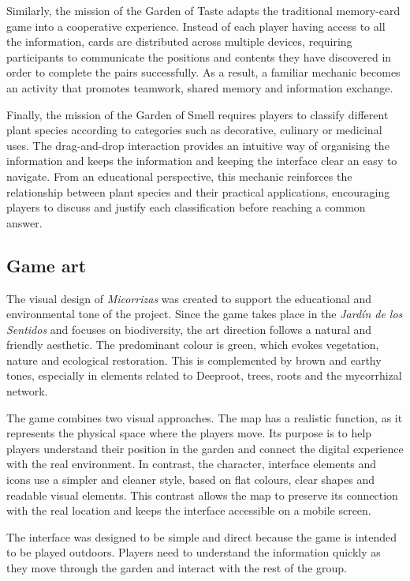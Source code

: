Similarly, the mission of the Garden of Taste adapts the traditional memory-card game into a cooperative experience. Instead of each player having access to all the information, cards are distributed across multiple devices, requiring participants to communicate the positions and contents they have discovered in order to complete the pairs successfully. As a result, a familiar mechanic becomes an activity that promotes teamwork, shared memory and information exchange.

Finally, the mission of the Garden of Smell requires players to classify different plant species according to categories such as decorative, culinary or medicinal uses. The drag-and-drop interaction provides an intuitive way of organising the information and keeps the information and keeping the interface clear an easy to navigate. From an educational perspective, this mechanic reinforces the relationship between plant species and their practical applications, encouraging players to discuss and justify each classification before reaching a common answer.

\subsection{Game art}
The visual design of \textit{Micorrizas} was created to support the educational and environmental tone of the project. Since the game takes place in the \textit{Jardín de los Sentidos} and focuses on biodiversity, the art direction follows a natural and friendly aesthetic. The predominant colour is green, which evokes vegetation, nature and ecological restoration. This is complemented by brown and earthy tones, especially in elements related to Deeproot, trees, roots and the mycorrhizal network.

The game combines two visual approaches. The map has a realistic function, as it represents the physical space where the players move. Its purpose is to help players understand their position in the garden and connect the digital experience with the real environment. In contrast, the character, interface elements and icons use a simpler and cleaner style, based on flat colours, clear shapes and readable visual elements. This contrast allows the map to preserve its connection with the real location and keeps the interface accessible on a mobile screen.

The interface was designed to be simple and direct because the game is intended to be played outdoors. Players need to understand the information quickly as they move through the garden and interact with the rest of the group.

